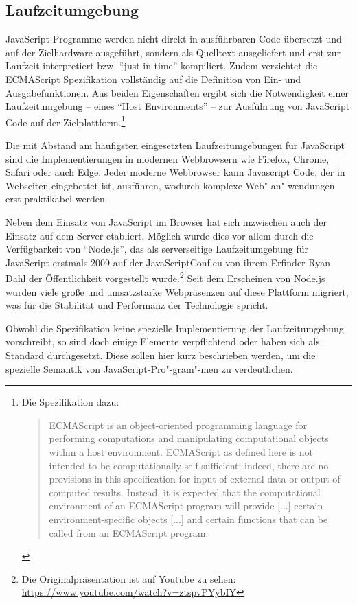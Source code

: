 \documentclass[
11pt, %
a4paper, %
oneside, %
pdfspacing, %
headinclude,
BCOR5mm, %
ngerman, %
bibtotocnumbered,
]{scrartcl}
\begin{document}
	\subsection{Laufzeitumgebung}
		JavaScript-Programme werden nicht direkt in ausführbaren Code übersetzt und auf der Zielhardware ausgeführt, sondern als Quelltext ausgeliefert und erst zur Laufzeit interpretiert bzw. "`just-in-time"' kompiliert. Zudem verzichtet die ECMAScript Spezifikation vollständig auf die Definition von Ein- und Ausgabefunktionen.
		Aus beiden Eigenschaften ergibt sich die Notwendigkeit einer Laufzeitumgebung -- eines "`Host Environments"' -- zur Ausführung von JavaScript Code auf der Zielplattform.\footnote{Die Spezifikation dazu:
		\begin{quote}
				ECMAScript is an object-oriented programming language for performing computations and manipulating computational objects within a host environment. ECMAScript as defined here is not intended to be computationally self-sufficient; indeed, there are no provisions in this specification for input of external data or output of computed results. Instead, it is expected that the computational environment of an ECMAScript program will provide [...] certain environment-specific objects [...] and certain functions that can be called from an ECMAScript program.~\citep[\S~4]{EcmaTC39.}
		\end{quote}}
		
		Die mit Abstand am häufigsten eingesetzten Laufzeitumgebungen für JavaScript sind die Implementierungen in modernen Webbrowsern wie Firefox, Chrome, Safari oder auch Edge. Jeder moderne Webbrowser kann Javascript Code, der in Webseiten eingebettet ist, ausführen, wodurch komplexe Web"-an"-wendungen erst praktikabel werden.
		
		Neben dem Einsatz von JavaScript im Browser hat sich inzwischen auch der Einsatz auf dem Server etabliert. Möglich wurde dies vor allem durch die Verfügbarkeit von "`Node.js"', das als serverseitige Laufzeitumgebung für JavaScript erstmals 2009 auf der JavaScriptConf.eu von ihrem Erfinder Ryan Dahl der Öffentlichkeit vorgestellt wurde.\footnote{Die Originalpräsentation ist auf Youtube zu sehen: \url{https://www.youtube.com/watch?v=ztspvPYybIY}}
		Seit dem Erscheinen von Node.js wurden viele große und umsatzstarke Webpräsenzen auf diese Plattform migriert, was für die Stabilität und Performanz der Technologie spricht.
		
		\skippingparagraph
		Obwohl die Spezifikation keine spezielle Implementierung der Laufzeitumgebung vorschreibt, so sind doch einige Elemente verpflichtend oder haben sich als Standard durchgesetzt. Diese sollen hier kurz beschrieben werden, um die spezielle Semantik von JavaScript-Pro"-gram"-men zu verdeutlichen.
		
\end{document}
